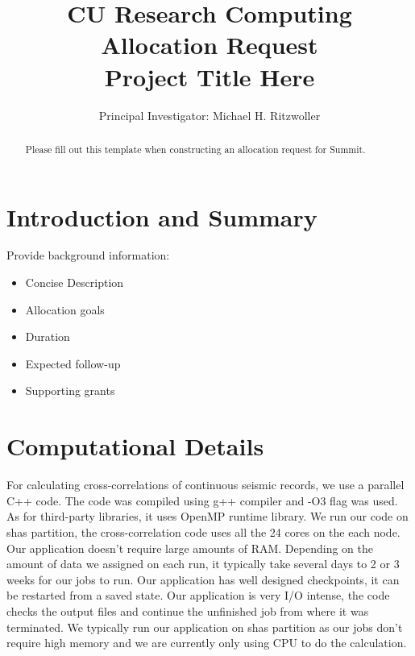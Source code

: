 \documentclass[11pt, oneside]{article}
\title{%
\bf{CU Research Computing Allocation Request} \\
\Large Project Title Here
}
\author{Principal Investigator:  Michael H. Ritzwoller}
\date{}							%
\begin{document}
\maketitle
\begin{abstract}
    Please fill out this template when constructing an allocation request for Summit.
\end{abstract}

\section{Introduction and Summary}

Provide background information:
\begin{itemize}
\item Concise Description
\item Allocation goals
\item Duration
\item Expected follow-up
\item Supporting grants
\end{itemize}


\section{Computational Details}

For calculating cross-correlations of continuous seismic records, we use a parallel C++ code. The code was compiled using g++ compiler and -O3 flag was used. As for third-party libraries, it uses OpenMP runtime library. We run our code on shas partition, the cross-correlation code uses all the 24 cores on the each node. Our application doesn't require large amounts of RAM. Depending on the amount of data we assigned on each run, it typically take several days to 2 or 3 weeks for our jobs to run. Our application has well designed checkpoints, it can be restarted from a saved state. Our application is very I/O intense, the code checks the output files and continue the unfinished job from where it was terminated. We typically run our application on shas partition as our jobs don't require high memory and we are currently only using CPU to do the calculation.
\end{document}
